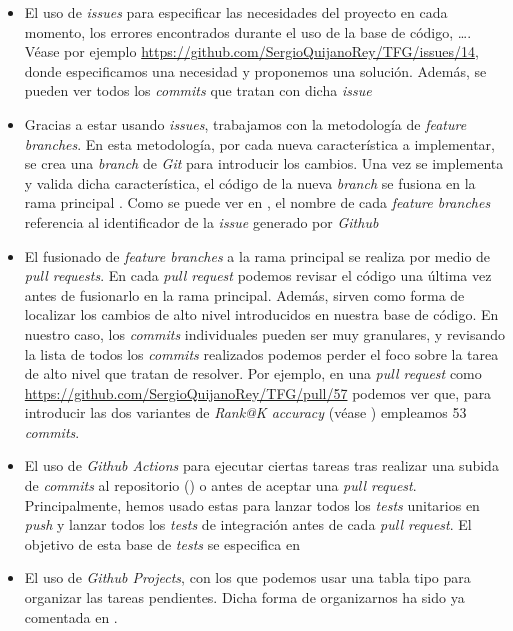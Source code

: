 \begin{itemize}
    \item El uso de \textit{issues} para especificar las necesidades del proyecto en cada momento, los errores encontrados durante el uso de la base de código, \ldots. Véase por ejemplo \url{https://github.com/SergioQuijanoRey/TFG/issues/14}, donde especificamos una necesidad y proponemos una solución. Además, se pueden ver todos los \textit{commits} que tratan con dicha \textit{issue}
    \item Gracias a estar usando \textit{issues}, trabajamos con la metodología de \textit{feature branches}. En esta metodología, por cada nueva característica a implementar, se crea una \textit{branch} de \textit{Git} para introducir los cambios. Una vez se implementa y valida dicha característica, el código de la nueva \textit{branch} se fusiona en la rama principal \cite{informatica:feature_branches}. Como se puede ver en \cite{informatica:repogithub}, el nombre de cada \textit{feature branches} referencia al identificador de la \textit{issue} generado por \textit{Github}
    \item El fusionado de \textit{feature branches} a la rama principal se realiza por medio de \textit{pull requests}. En cada \textit{pull request} podemos revisar el código una última vez antes de fusionarlo en la rama principal. Además, sirven como forma de localizar los cambios de alto nivel introducidos en nuestra base de código. En nuestro caso, los \textit{commits} individuales pueden ser muy granulares, y revisando la lista de todos los \textit{commits} realizados podemos perder el foco sobre la tarea de alto nivel que tratan de resolver. Por ejemplo, en una \textit{pull request} como \url{https://github.com/SergioQuijanoRey/TFG/pull/57} podemos ver que, para introducir las dos variantes de \textit{Rank@K accuracy} (véase ) empleamos 53 \textit{commits}.
    \item El uso de \textit{Github Actions} para ejecutar ciertas tareas tras realizar una subida de \textit{commits} al repositorio () o antes de aceptar una \textit{pull request}. Principalmente, hemos usado estas  para lanzar todos los \textit{tests} unitarios en \textit{push} y lanzar todos los \textit{tests} de integración antes de cada \textit{pull request}. El objetivo de esta base de \textit{tests} se especifica en 
    \item El uso de \textit{Github Projects}, con los que podemos usar una tabla tipo  para organizar las tareas pendientes. Dicha forma de organizarnos ha sido ya comentada en .
\end{itemize}

